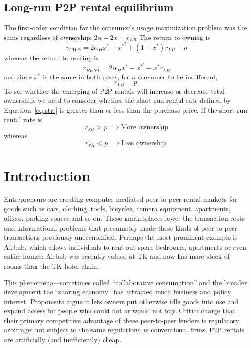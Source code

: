 \documentclass[11pt]{article}
\begin{document}
\subsection{Long-run P2P rental equilibrium} 
The first-order condition for the consumer's usage maximization problem was the same regardless of ownership: $2 \alpha - 2x = r_{LR}$ 
The return to owning is 
\begin{equation}
v_{OWN} = 2\alpha_H x^* - x^*^2 + (1-x^*)r_{LR} - p   
\end{equation} 
whereas the return to renting is 
\begin{equation}
v_{RENT} = 2\alpha_H x^* - x^*^2 - x^*r_{LR}  
\end{equation} 
and since $x^*$ is the same in both cases, for a consumer to be indifferent,  
\begin{equation}
r_{LR} = p.  
\end{equation}  
To see whether the emerging of P2P rentals will increase or decrease total ownership, we need to consider whether the short-run rental rate defined by Equation~\ref{eq:strr} is greater than or less than the purchase price. 
If the short-run rental rate is
\begin{equation}
 r_{SR} > p \implies \mbox{More ownership} 
\end{equation}  
whereas
\begin{equation}
 r_{SR} < p \implies \mbox{Less ownership}.  
\end{equation}  






 



\section{Introduction}
Entrepreneurs are creating computer-mediated peer-to-peer rental markets for goods such as cars, clothing, tools, bicycles, camera equipment, apartments, offices, parking spaces and so on.
These marketplaces lower the transaction costs and informational problems that presumably made these kinds of peer-to-peer transactions previously uneconomical.
Perhaps the most prominent example is Airbnb, which allows individuals to rent out spare bedrooms, apartments or even entire homes: Airbnb was recently valued at TK and now has more stock of rooms than the TK hotel chain. 
 
This phenomena---sometimes called ``collaborative consumption'' and the broader development the ``sharing economy'' has attracted much business and policy interest.  
Proponents argue it lets owners put otherwise idle goods into use and expand access for people who could not or would not buy. 
Critics charge that their primary competitive advantage of these peer-to-peer lenders is regulatory arbitrage: 
not subject to the same regulations as conventional firms, P2P rentals are artificially (and inefficiently) cheap. 
\end{document}
